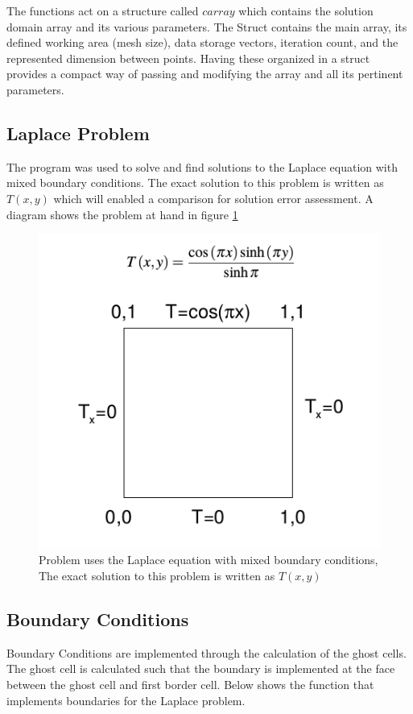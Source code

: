 \documentclass[paper=a4, fontsize=11pt, abstract=on]{scrartcl}
\numberwithin{equation}{section}		%
\numberwithin{figure}{section}			%
\numberwithin{table}{section}				%
\begin{document}
The functions act on a structure called $carray$ which contains the solution domain array and its various parameters. The Struct contains the main array, its defined working area (mesh size), data storage vectors, iteration count, and the represented dimension between points. Having these organized in a struct provides a compact way of passing and modifying the array and all its pertinent parameters.
 
\subsection{Laplace Problem}
The program was used to solve and find solutions to the Laplace equation with mixed boundary conditions. The exact solution to this problem is written as $T(x,y)$ which will enabled a comparison for solution error assessment. A diagram shows the problem at hand in figure \ref{schem}
\begin{figure}[H]
\centering
\includegraphics[width=0.65\linewidth]{prob}
\caption{Problem uses the Laplace equation with
mixed boundary conditions, The exact solution to this problem is written as $T(x,y)$}
\label{schem}
\end{figure} 

\subsection{Boundary Conditions}
Boundary Conditions are implemented through the calculation of the ghost cells. The ghost cell is calculated such that the boundary is implemented at the face between the ghost cell and first border cell. Below shows the function that implements boundaries for the Laplace problem.
\end{document}
